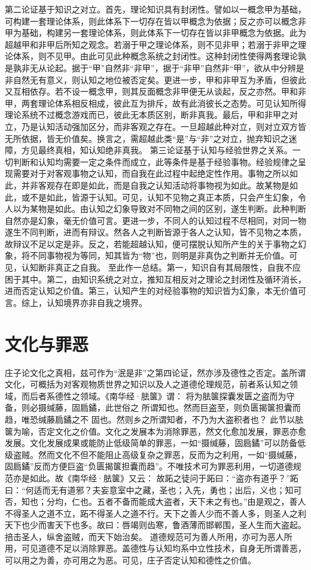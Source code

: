 \documentclass[11pt]{article}
\begin{document}
\newline

第二论证基于知识之对立。首先，理论知识具有封闭性。譬如以一概念甲为基础，可构建一套理论体系，则此体系下一切存在皆以甲概念为依据；反之亦可以概念非甲为基础，构建另一套理论体系，则此体系下一切存在皆以非甲概念为依据。此为超越甲和非甲后所知之观念。若溺于甲之理论体系，则不见非甲；若溺于非甲之理论体系，则不见甲。由此可见此种概念系统之封闭性。这种封闭性使得两套理论孰是孰非无从论起。据于“甲”自然非“非甲”，据于“非甲”自然非“甲”，欲从中分辨是非自然无有意义，则认知之地位被否定矣。更进一步，甲和非甲互为矛盾，但彼此又互相依存。若不设一概念甲，则其反面概念非甲便无从谈起，反之亦然。甲和非甲，两套理论体系相反相成，彼此互为排斥，故有此消彼长之态势。可见认知所得理论系统不过概念游戏而已，彼此无本质区别，断非真我。最后，甲和非甲之对立，乃是认知活动强加区分，而非客观之存在。一旦超越此种对立，则对立双方皆无所依据，皆无价值矣。换言之，需超越此类“是”与“非”之对立，抛弃知识之迷障，方见最终真相，知认知绝非真我。
第三论证基于认知与经验世界之关系。一切判断和认知均需要一定之条件而成立，此等条件是基于经验事物。经验规律之呈现需要对于对客观事物之认知，而自我在此过程中起绝定性作用。事物之所以如此，并非客观存在即是如此，而是自我之认知活动将事物视为如此。故某物是如此，或不是如此，皆源于认知。可见，认知不见物之真正本质，只会产生幻象，令人以为某物是如此。由认知之幻象导致对不同物之间的区别，遂生判断。此种判断自然亦是幻象，毫无价值可言。更进一步，不同人的认知过程不尽相同，对同一物遂生不同判断，进而有辩议。然各人之判断皆源于各人之认知，皆不见物之本质，故辩议不足以定是非。反之，若能超越认知，便可摆脱认知所产生的关于事物之幻象，将不同事物视为等同，知其皆为“物”也，则明是非真伪之判断并无价值。可见，认知断非真正之自我。
至此作一总结。第一，知识自有其局限性，自我不应困于其中。第二，由知识系统之对立，推知互相反对之理论之封闭性及循环消长，进而否定认知之价值。第三，认知产生的对经验事物的知识皆为幻象，本无价值可言。综上，认知境界亦非自我之境界。

\section{文化与罪恶}
庄子论文化之真相，兹可作为“泯是非”之第四论证，然亦涉及德性之否定。盖所谓文化，可概括为对客观物质世界之知识以及人之道德伦理规范，前者系认知之领域，而后者系德性之领域。《南华经·胠箧》谓：
将为胠箧探囊发匮之盗而为守备，则必摄缄藤，固扃鐍，此世俗之 所谓知也。然而巨盗至，则负匮揭箧担囊而趋，唯恐缄藤扃鐍之不 固也。然则乡之所谓知者，不乃为大盗积者也？
此节以胠箧为喻，否定文化之价值。文化之发展本为消除罪恶，然文化愈加发展，罪恶亦愈发展。文化发展成果或能防止低级简单的罪恶，一如“摄缄藤，固扃鐍”可以防备低级盗贼。然而文化不但不能阻止高级复杂之罪恶，反而为之利用，一如“摄缄藤，固扃鐍”反而方便巨盗“负匮揭箧担囊而趋”。不唯技术可为罪恶利用，一切道德规范亦是如此。故《南华经·胠箧》又云：
故跖之徒问于跖曰：“盗亦有道乎？”跖曰：“何适而无有道邪？夫妄意室中之藏，圣也；入先，勇也；出后，义也；知可否，知也；分均，仁也。五者不备而能成大盗者，天下未之有也。”由是观之，善人不得圣人之道不立，跖不得圣人之道不行。天下之善人少而不善人多，则圣人之利天下也少而害天下也多。故曰：唇竭则齿寒，鲁酒薄而邯郸围，圣人生而大盗起。掊击圣人，纵舍盗贼，而天下始治矣。
道德规范可为善人所用，亦可为恶人所用，可见道德不足以消除罪恶。盖德性与认知均系中立性技术，自身无所谓善恶，可以用之为善，亦可用之为恶。可见，庄子否定认知和德性之价值。
\end{document}
